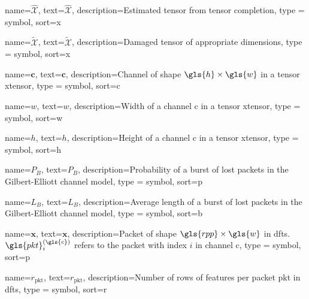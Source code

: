 %
{%
	name={$\hat{\mathcal{X}}$},
	text={\ensuremath{\hat{\mathcal{X}}}},
	description={Estimated tensor from tensor completion},
	type = {symbol},
	sort={x}
}

%
{%
	name={$\tilde{\mathcal{X}}$},
	text={\ensuremath{\tilde{\mathcal{X}}}},
	description={Damaged tensor of appropriate dimensions},
	type = {symbol},
	sort={x}
}

%
{%
	name={$\mathbf{c}$},
	text={\ensuremath{\mathbf{c}}},
	description={Channel of shape $\gls{h} \times \gls{w}$ in a tensor \gls{xtensor}},
	type = {symbol},
	sort={c}
}

%
{%
	name={$w$},
	text={\ensuremath{w}},
	description={Width of a channel \gls{c} in a tensor \gls{xtensor}},
	type = {symbol},
	sort={w}
}

%
{%
	name={$h$},
	text={\ensuremath{h}},
	description={Height of a channel \gls{c} in a tensor \gls{xtensor}},
	type = {symbol},
	sort={h}
}

%
{%
	name={$P_B$},
	text={\ensuremath{P_B}},
	description={Probability of a burst of lost packets in the Gilbert-Elliott channel model},
	type = {symbol},
	sort={p}
}

%
{%
	name={$L_B$},
	text={\ensuremath{L_B}},
	description={Average length of a burst of lost packets in the Gilbert-Elliott channel model},
	type = {symbol},
	sort={b}
}


%
{%
	name={$\mathbf{x}$},
	text={\ensuremath{\mathbf{x}}},
	description={Packet of shape $\gls{rpp} \times \gls{w}$ in \gls{dfts}. $\gls{pkt}_i^{(\gls{c})}$ refers to the packet with index $i$ in channel \gls{c}},
	type = {symbol},
	sort={p}
}

%
{%
	name={$r_\text{pkt}$},
	text={\ensuremath{r_\text{pkt}}},
	description={Number of rows of features per packet \gls{pkt} in \gls{dfts}},
	type = {symbol},
	sort={r}
}